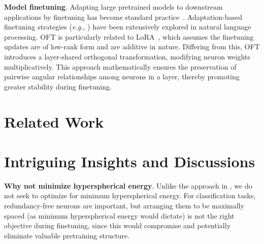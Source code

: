 \begin{itemize}[leftmargin=*,nosep]
\begin{itemize}[leftmargin=*,nosep]
\textbf{Model finetuning}. Adapting large pretrained models to downstream applications by finetuning has become standard practice~\cite{devlin2018bert,brown2020language,he2022masked}. Adaptation-based finetuning strategies (\emph{e.g.}, \cite{hulora2022,houlsby2019parameter,pfeiffer2020adapterfusion}) have been extensively explored in natural language processing. OFT is particularly related to LoRA~\cite{hulora2022}, which assumes the finetuning updates are of low-rank form and are additive in nature. Differing from this, OFT introduces a layer-shared orthogonal transformation, modifying neuron weights multiplicatively. This approach mathematically ensures the preservation of pairwise angular relationships among neurons in a layer, thereby promoting greater stability during finetuning.

\section{Related Work}

\section{Intriguing Insights and Discussions}

\textbf{Why not minimize hyperspherical energy}. Unlike the approach in \cite{liu2021orthogonal}, we do not seek to optimize for minimum hyperspherical energy. For classification tasks, redundancy-free neurons are important, but arranging them to be maximally spaced (as minimum hyperspherical energy would dictate) is not the right objective during finetuning, since this would compromise and potentially eliminate valuable pretraining structure.


\end{itemize}
\end{itemize}
